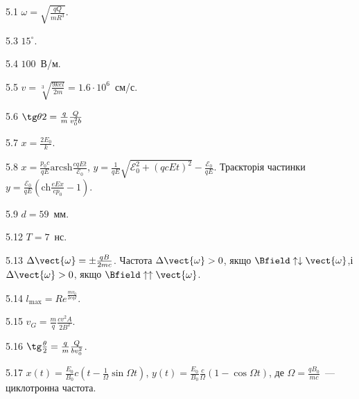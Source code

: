 \protect \section *{}
\begin{Solution}{5.{1}}
	$\omega = \sqrt{\frac{qQ}{mR^3}}$.
\end{Solution}
\begin{Solution}{5.{3}}
    $15^\circ$.
\end{Solution}
\begin{Solution}{5.{4}}
    $100$~В/м.
\end{Solution}
\begin{Solution}{5.{5}}
    $v = \sqrt[3]{\frac{9kel}{2m}} = 1.6\cdot10^6$~см/с.
\end{Solution}
\begin{Solution}{5.{6}}
	$\tg\theta2 = \frac qm\frac{Q}{v_0^2b}$
\end{Solution}
\begin{Solution}{5.{7}}
	$x = \frac{2E_0}{k}$.
\end{Solution}
\begin{Solution}{5.{8}}
	$x = \frac{p_0c}{qE} \mathrm{arcsh}\frac{cqEt}{\mathcal{E}_0}$, $y = \frac{1}{qE}\sqrt{\mathcal{E}_0^2 + (qcEt)^2} - \frac{\mathcal{E}_0}{qE}$. Траєкторія частинки $y = \frac{\mathcal{E}_0}{qE} \left( \mathrm{ch}\frac{eEx}{cp_0} - 1\right) $.
\end{Solution}
\begin{Solution}{5.{9}}
    $d = 59$~мм.
\end{Solution}
\begin{Solution}{5.{12}}
    $T = 7$~нс.
\end{Solution}
\begin{Solution}{5.{13}}
	$\Delta\vect{\omega} = \pm\frac{qB}{2mc}$. Частота $\Delta\vect{\omega}>0$, якщо $\Bfield \uparrow\downarrow \vect{\omega}$,і
	$\Delta\vect{\omega}>0$, якщо $\Bfield \uparrow\uparrow \vect{\omega}$.
\end{Solution}
\begin{Solution}{5.{14}}
	$l_{\max} = Re^{\frac{mv_0}{2cqI}}$.
\end{Solution}
\begin{Solution}{5.{15}}
	$v_G = \frac{m}{q}\frac{cv^2A}{2B^2}.$
\end{Solution}
\begin{Solution}{5.{16}}
	$\tg\frac{\theta}{2} = \frac qm \frac{Q}{bv_0^2}$.
\end{Solution}
\begin{Solution}{5.{17}}
	$x(t)  = \frac{E_0}{B_0}c\left( t - \frac{1}{\Omega}\sin\Omega t \right) $,
	$y(t)  = \frac{E_0}{B_0} \frac{c}{\Omega}\left( 1 - \cos\Omega t \right) $, де $\Omega = \frac{qB_0}{mc}$~--- циклотронна частота.
\end{Solution}
